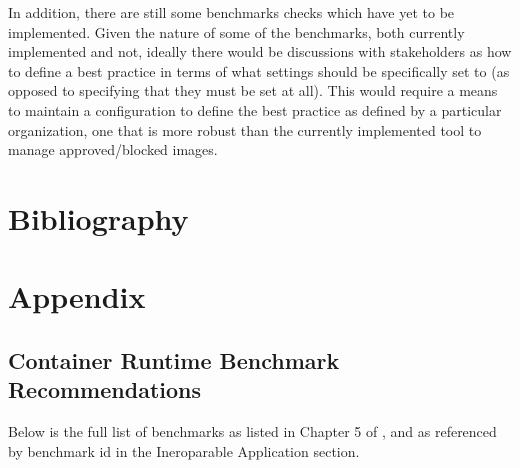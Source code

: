 \documentclass[times, twoside, watermark]{zHenriquesLab-StyleBioRxiv}
\begin{document}
In addition, there are still some benchmarks checks which have yet to be implemented. Given the nature of some of the benchmarks, both currently implemented and not, ideally there would be discussions with stakeholders as how to define a best practice in terms of what settings should be specifically set to (as opposed to specifying that they must be set at all). This would require a means to maintain a configuration to define the best practice as defined by a particular organization, one that is more robust than the currently implemented tool to manage approved/blocked images.

\section*{Bibliography}



\section*{Appendix}

\subsection*{Container Runtime Benchmark Recommendations} Below is the full list of benchmarks as listed in Chapter 5 of \cite{center_for_internet_security}, and as referenced by benchmark id in the Ineroparable Application section.
\end{document}
